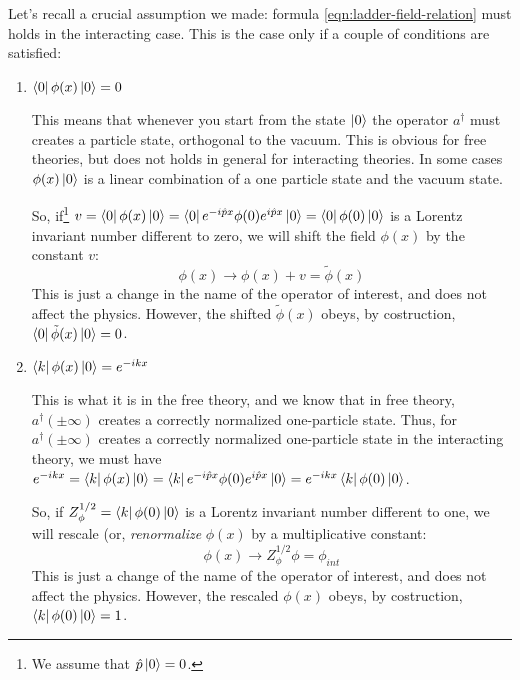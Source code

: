 \documentclass[../main/main.tex]{subfiles}
\begin{document}
Let's recall a crucial assumption we made: formula \eqref {eqn:ladder-field-relation} must holds in the interacting case.
This is the case only if a couple of conditions are satisfied:
\begin{enumerate}
\item $\bra0\phi(x)\ket0=0$

This means that whenever you start from the state $\ket0$ the operator $a^\dagger$ must creates a particle state, orthogonal to the vacuum. This is obvious for free theories, but does not holds in general for interacting theories. In some cases $\phi(x)\ket0$ is a linear combination of a one particle state and the vacuum state. 

So, if\footnote{We assume that $\hat p\ket0=0$.} $v=\bra0\phi(x)\ket0=\bra0e^{-i\hat px}\phi(0)e^{i\hat px}\ket0=\bra0\phi(0)\ket0$ is a Lorentz invariant number different to zero, we will shift the field $\phi(x)$ by the constant $v$:
\[\phi(x)\rightarrow\phi(x)+v=\tilde \phi(x)\]
This is just a change in the name of the operator of interest, and does not affect the physics. However, the shifted $\tilde\phi(x)$ obeys, by costruction, $\bra0\tilde\phi(x)\ket0=0$.
\item $\bra k\phi(x)\ket 0=e^{-ikx}$

This is what it is in the free theory, and we know that in free theory, $a^\dagger(\pm\infty)$ creates a correctly normalized one-particle state. Thus, for $a^\dagger(\pm\infty)$ creates a correctly normalized one-particle state in the interacting theory, we must have $e^{-ikx}=\bra k\phi(x)\ket 0=\bra ke^{-i\hat px}\phi(0)e^{i\hat px}\ket0=e^{-ikx}\bra k\phi(0)\ket 0$.

So, if $Z_\phi^{1/2}=\bra k\phi(0)\ket 0$ is a Lorentz invariant number different to one, we will rescale (or, \emph{renormalize} $\phi(x)$ by a multiplicative constant:
\[\phi(x)\rightarrow Z_{\phi}^{1/2}\phi=\phi_{int}\]
 This is just a change of the name of the operator of interest, and does not affect the physics. However, the rescaled $\phi(x)$ obeys, by costruction, $\bra k\phi(0)\ket 0=1$.
\end{enumerate}
\end{document}
